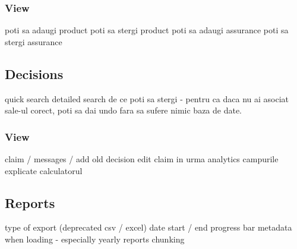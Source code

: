 		\subsubsection{View}
				poti sa adaugi product
				poti sa stergi product
				poti sa adaugi assurance
				poti sa stergi assurance
	\subsection{Decisions}
		quick search
		detailed search
		de ce poti sa stergi - pentru ca daca nu ai asociat sale-ul corect, poti sa dai undo fara sa sufere nimic baza de date.
		\subsubsection{View}
				claim / messages / add old decision
				edit claim in urma analytics
				campurile explicate
				calculatorul
	\subsection{Reports}
		type of export (deprecated csv / excel)
		date start / end
		progress bar
		metadata when loading - especially yearly reports
		chunking 
